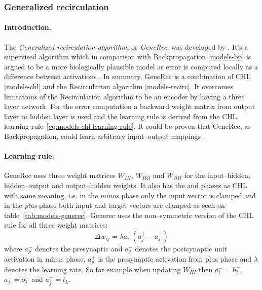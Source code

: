 \subsubsection{Generalized recirculation}
\label{models-generec} 

\paragraph{Introduction.} 
The \emph{Generalized recirculation algorithm}, or \emph{GeneRec}, was developed by \citet{o1996bio}. It's a supervised algorithm which in comparison with Backpropagation \ref{models-bp} is argued to be a more biologically plausible model as error is computed locally as a difference between activations \citep{o1998six, o2001generalization, da2011advances, schneider2009application}. In summary, GeneRec is a combination of CHL \ref{models-chl} and the Recirculation algorithm \ref{models-recirc}. It overcomes limitations of the Recirculation algorithm to be an encoder by having a three layer network. For the error computation a backward weight matrix from output layer to hidden layer is used and the learning rule is derived from the CHL learning rule~\ref{eq:models-chl-learning-rule}. It could be proven that GeneRec, as Backpropagation, could learn arbitrary input--output mappings \citep{o1996bio}. 

\paragraph{Learning rule.} 
GeneRec uses three weight matrices $W_{IH}$, $W_{HO}$ and $W_{OH}$ for the input--hidden, hidden--output and output--hidden weights. It also has the \quotes{-} and \quotes{+} phases as CHL with same meaning, i.e. in the \emph{minus} phase only the input vector is clamped and in the \emph{plus} phase both input and target vectors are clamped as seen on table~\ref{tab:models-generec}. Generec uses the non--symmetric version of the CHL rule for all three weight matrices: 
\begin{equation}
  \label{eq:models-generec-learning-rule}
  \Delta w_{ij} = \lambda a^{-}_i(a^{+}_j - a^{-}_j)
\end{equation}
where $a^{-}_p$ denotes the presynaptic and $a^{-}_q$ denotes the postsynaptic unit activation in minus phase, $a^{+}_p$ is the presynaptic activation from plus phase and $\lambda$ denotes the learning rate. So for example when updating $W_{HI}$ then $a^{-}_i = h^{-}_i$, $a^{-}_j = o^{-}_j$ and $a^{+}_j = t_k$. 

